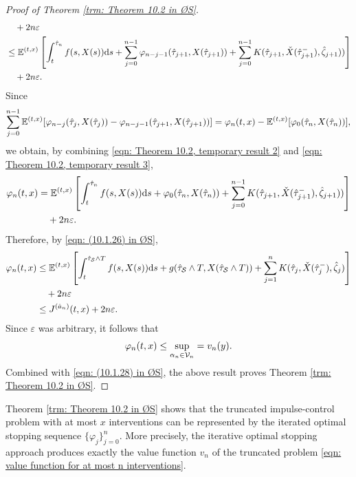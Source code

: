 \begin{proof}[Proof of Theorem \ref{trm: Theorem 10.2 in ØS}]
\begin{align}
        & \quad + 2n\varepsilon \nonumber \\
        & \leq \mathbb{E}^{(t,x)} \left[ \int_t^{\hat{\tau}_n}f(s,X(s)) \mathrm{d} s + \sum_{j=0}^{n-1}\varphi_{n-j-1}(\hat{\tau}_{j+1}, X(\hat{\tau}_{j+1})) +  \sum_{j=0}^{n-1} K(\hat{\tau}_{j+1},\check{X}(\hat{\tau}_{j+1}^-), \hat{\zeta}_{j+1}))  \right] \nonumber \\ 
        & \quad + 2n\varepsilon.
        \label{eqn: Theorem 10.2, temporary result 2}
    \end{align}
    Since 
    \begin{equation}
        \sum_{j=0}^{n-1} \mathbb{E}^{(t,x)}[\varphi_{n-j}(\hat{\tau}_j, X(\hat{\tau}_j)) - \varphi_{n-j-1}(\hat{\tau}_{j+1}, X(\hat{\tau}_{j+1}))] = \varphi_n(t,x) - \mathbb{E}^{(t,x)}[\varphi_0(\hat{\tau}_n, X(\hat{\tau}_n))],
        \label{eqn: Theorem 10.2, temporary result 3}
    \end{equation}
    we obtain, by combining \eqref{eqn: Theorem 10.2, temporary result 2} and \eqref{eqn: Theorem 10.2, temporary result 3},
    \begin{align*}
        \varphi_n(t,x) &= \mathbb{E}^{(t,x)} \left[ \int_t^{\hat{\tau}_n}f(s,X(s)) \mathrm{d} s + \varphi_0(\hat{\tau}_n, X(\hat{\tau}_n)) +  \sum_{j=0}^{n-1} K(\hat{\tau}_{j+1},\check{X}(\hat{\tau}_{j+1}^-), \hat{\zeta}_{j+1})) \right] \\
        & \quad + 2n \varepsilon.
    \end{align*}
    Therefore, by \eqref{eqn: (10.1.26) in ØS},
    \begin{align*}
        \varphi_n(t,x) &\leq \mathbb{E}^{(t,x)} \left[ \int_t^{\hat{\tau}_\mathcal{S} \wedge T} f(s,X(s)) \mathrm{d} s + g(\hat{\tau}_\mathcal{S} \wedge T,X(\hat{\tau}_\mathcal{S} \wedge T)) + \sum_{j=1}^n K(\hat{\tau}_j,\check{X}(\hat{\tau}_j^-),\hat{\zeta}_j)\right] \\
        & \quad + 2n\varepsilon \\
        & \leq J^{(\hat{a}_n)}(t,x) + 2n\varepsilon.
    \end{align*}
    Since $\varepsilon$ was arbitrary, it follows that
    \begin{equation*}
        \varphi_n(t,x) \leq \sup_{\alpha_n \in \mathcal{V}_n} = v_n(y).
    \end{equation*}
    Combined with \eqref{eqn: (10.1.28) in ØS}, the above result proves Theorem \ref{trm: Theorem 10.2 in ØS}.
\end{proof}

Theorem \ref{trm: Theorem 10.2 in ØS} shows that the truncated impulse-control problem with at most $x$ interventions can be represented by the iterated optimal stopping sequence $\{\varphi_j\}_{j=0}^n$. More precisely, the iterative optimal stopping approach produces exactly the value function $v_n$ of the truncated problem \eqref{eqn: value function for at most n interventions}.

